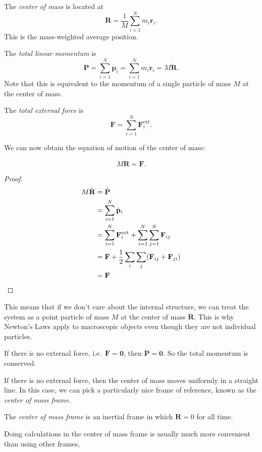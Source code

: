 \documentclass[a4paper]{article}
\begin{document}
\begin{defi}
  The \emph{center of mass} is located at
  \[
    \mathbf{R} = \frac{1}{M}\sum_{i = 1}^N m_i\mathbf{r}_i.
  \]
  This is the mass-weighted average position.
\end{defi}

\begin{defi}
  The \emph{total linear momentum} is
  \[
    \mathbf{P} = \sum_{i = 1}^N \mathbf{p}_i = \sum_{i = 1}^N m_i \dot{\mathbf{r}}_i = M\dot{\mathbf{R}}.
  \]
  Note that this is equivalent to the momentum of a single particle of mass $M$ at the center of mass.
\end{defi}

\begin{defi}
  The \emph{total external force} is
  \[
    \mathbf{F} = \sum_{i = 1}^N \mathbf{F}_i^{\text{ext}}.
  \]
\end{defi}

We can now obtain the equation of motion of the center of mass:
\begin{prop}
  \[
    M\ddot{\mathbf{R}} = \mathbf{F}.
  \]
\end{prop}

\begin{proof}
  \begin{align*}
    M\ddot{\mathbf{R}} &= \dot{\mathbf{P}}\\
    &= \sum_{i = 1}^N \dot{\mathbf{p}}_i\\
    &= \sum_{i = 1}^N \mathbf{F}_i^{\text{ext}} + \sum_{i = 1}^N\sum_{j = 1}^N \mathbf{F}_{ij}\\
    &= \mathbf{F} + \frac{1}{2}\sum_i \sum_j(\mathbf{F}_{ij} + \mathbf{F}_{ji})\\
    &= \mathbf{F}\qedhere
  \end{align*}
\end{proof}
This means that if we don't care about the internal structure, we can treat the system as a point particle of mass $M$ at the center of mass $\mathbf{R}$. This is why Newton's Laws apply to macroscopic objects even though they are not individual particles.

\begin{law}
  If there is no external force, i.e.\ $\mathbf{F} = \mathbf{0}$, then $\dot{\mathbf{P}} = \mathbf{0}$. So the total momentum is conserved.
\end{law}

If there is no external force, then the center of mass moves uniformly in a straight line. In this case, we can pick a particularly nice frame of reference, known as the \emph{center of mass frame}.
\begin{defi}
  The \emph{center of mass frame} is an inertial frame in which $\mathbf{R} = 0$ for all time.
\end{defi}
Doing calculations in the center of mass frame is usually much more convenient than using other frames,
\end{document}
